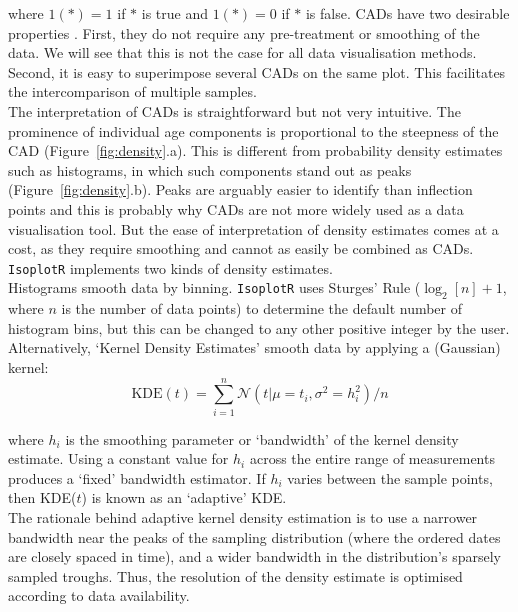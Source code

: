 \begin{refsection}
\noindent where $1(\ast) = 1$ if $\ast$ is true and $1(\ast) = 0$ if
$\ast$ is false. CADs have two desirable properties
\citep{vermeesch2007a}.  First, they do not require any pre-treatment
or smoothing of the data.  We will see that this is not the case for
all data visualisation methods. Second, it is easy to superimpose
several CADs on the same plot. This facilitates the intercomparison of
multiple samples.\\

The interpretation of CADs is straightforward but not very
intuitive. The prominence of individual age components is proportional
to the steepness of the CAD (Figure~\ref{fig:density}.a). This is
different from probability density estimates such as histograms, in
which such components stand out as peaks
(Figure~\ref{fig:density}.b). Peaks are arguably easier to identify
than inflection points and this is probably why CADs are not more
widely used as a data visualisation tool. But the ease of
interpretation of density estimates comes at a cost, as they require
smoothing and cannot as easily be combined as CADs. \texttt{IsoplotR}
implements two kinds of density estimates.\\

Histograms smooth data by binning. \texttt{IsoplotR} uses Sturges'
Rule ($\log_2[n]+1$, where $n$ is the number of data points) to
determine the default number of histogram bins, but this can be
changed to any other positive integer by the user. Alternatively,
`Kernel Density Estimates' \citep[KDEs;][]{vermeesch2012b} smooth data
by applying a (Gaussian) kernel:
\begin{equation}
  \mathrm{KDE}(t) = \sum_{i=1}^{n}\mathcal{N}\left(t | \mu=t_i,
  \sigma^2=h_i^2\right)/n
  \label{eq:KDE}
\end{equation}

\noindent where $h_i$ is the smoothing parameter or `bandwidth' of the
kernel density estimate. Using a constant value for $h_i$ across the
entire range of measurements produces a `fixed' bandwidth estimator.
If $h_i$ varies between the sample points, then KDE($t$) is known as
an `adaptive' KDE.\\

The rationale behind adaptive kernel density estimation is to use a
narrower bandwidth near the peaks of the sampling distribution (where
the ordered dates are closely spaced in time), and a wider bandwidth
in the distribution's sparsely sampled troughs. Thus, the resolution
of the density estimate is optimised according to data
availability.\\


\end{refsection}
